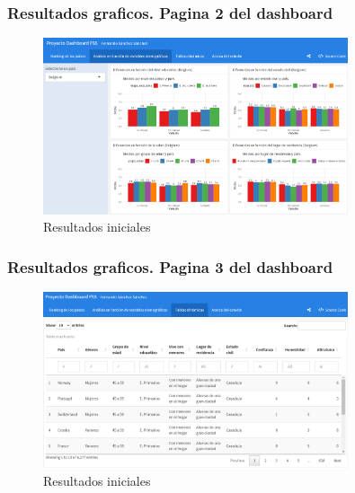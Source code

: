 \documentclass{beamer}
\begin{document}
\begin{frame}
\frametitle{Resultados graficos. Pagina 2 del dashboard}
\begin{figure}[ht]
\centering
\includegraphics[width=0.8\textwidth]{Figura_2.png}
\caption{Resultados iniciales}
\end{figure}
\end{frame}

\begin{frame}
\frametitle{Resultados graficos. Pagina 3 del dashboard}
\begin{figure}[ht]
\centering
\includegraphics[width=0.8\textwidth]{Figura_3.png}
\caption{Resultados iniciales}
\end{figure}
\end{frame}
\end{document}
